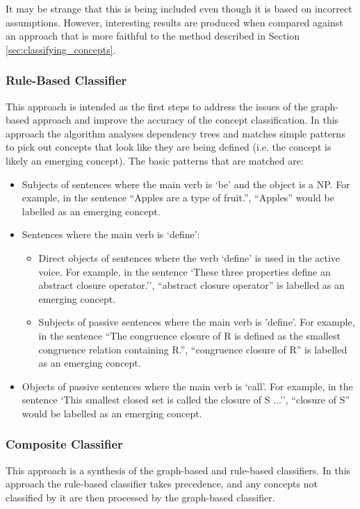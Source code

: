 \documentclass[12pt]{article}
\theoremstyle{grammarstyle}
\begin{document}
It may be strange that this is being included even though it is based on incorrect assumptions. However, interesting results are produced when compared against an approach that is more faithful to the method described in Section \ref{sec:classifying_concepts}.

\subsubsection{Rule-Based Classifier} \label{sec:rule-based_classifier}
This approach is intended as the first steps to address the issues of the graph-based approach and improve the accuracy of the concept classification.
In this approach the algorithm analyses dependency trees and matches simple patterns to pick out concepts that look like they are being defined (i.e. the concept is likely an emerging concept).
The basic patterns that are matched are:
\begin{itemize}
    \item Subjects of sentences where the main verb is `be' and the object is a NP.
    For example, in the sentence ``Apples are a type of fruit.'', ``Apples'' would be labelled as an emerging concept.
    \item Sentences where the main verb is `define':

    \begin{itemize}
        \item Direct objects of sentences where the verb `define' is used in the active voice.
        For example, in the sentence `These three properties define an abstract closure operator.'', ``abstract closure operator'' is labelled as an emerging concept.
        \item Subjects of passive sentences where the main verb is 'define'.
        For example, in the sentence ``The congruence closure of R is defined as the smallest congruence relation containing R.'', ``congruence closure of R'' is labelled as an emerging concept.
    \end{itemize}

    \item Objects of passive sentences where the main verb is `call'.
    For example, in the sentence `This smallest closed set is called the closure of S ...'', ``closure of S'' would be labelled as an emerging concept.

\end{itemize}

\subsubsection{Composite Classifier}This approach is a synthesis of the graph-based and rule-based classifiers.
In this approach the rule-based classifier takes precedence, and any concepts not classified by it are then processed by the graph-based classifier.
\end{document}
